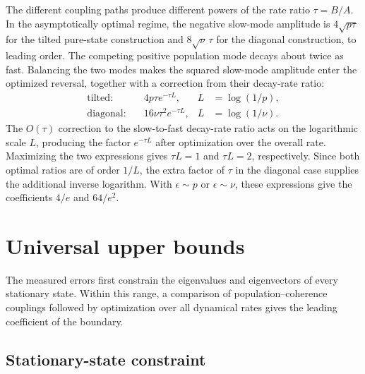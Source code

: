 \documentclass[aps,pra,reprint,amsmath,amssymb,nofootinbib,floatfix,longbibliography]{revtex4-2}
\theoremstyle{aps}
\newcommand{\eps}{\epsilon}
\begin{document}
The different coupling paths produce different powers of the rate ratio $\tau=B/A$. In the asymptotically optimal regime, the negative slow-mode amplitude is $4\sqrt{p\tau}$ for the tilted pure-state construction and $8\sqrt\nu\,\tau$ for the diagonal construction, to leading order. The competing positive population mode decays about twice as fast. Balancing the two modes makes the squared slow-mode amplitude enter the optimized reversal, together with a correction from their decay-rate ratio:
\begin{equation}\label{eq:mechanism-scales}
 \begin{aligned}
 \text{tilted:}\quad &4p\tau e^{-\tau L},
 &L&=\log(1/p),\\
 \text{diagonal:}\quad &16\nu\tau^2e^{-\tau L},
 &L&=\log(1/\nu).
 \end{aligned}
\end{equation}
The $O(\tau)$ correction to the slow-to-fast decay-rate ratio acts on the logarithmic scale $L$, producing the factor $e^{-\tau L}$ after optimization over the overall rate. Maximizing the two expressions gives $\tau L=1$ and $\tau L=2$, respectively. Since both optimal ratios are of order $1/L$, the extra factor of $\tau$ in the diagonal case supplies the additional inverse logarithm. With $\eps\sim p$ or $\eps\sim\nu$, these expressions give the coefficients $4/e$ and $64/e^2$.



\section{Universal upper bounds}\label{sec:universal}

The measured errors first constrain the eigenvalues and eigenvectors of every stationary state. Within this range, a comparison of population--coherence couplings followed by optimization over all dynamical rates gives the leading coefficient of the boundary.

\subsection{Stationary-state constraint}
\end{document}
